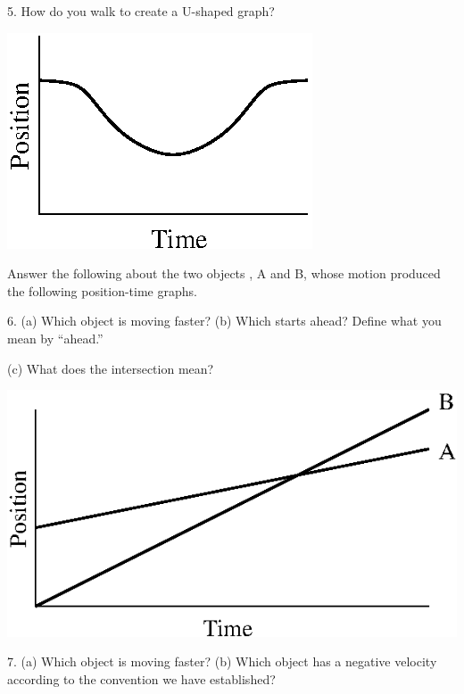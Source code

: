 5. How do you walk to create a U-shaped graph?

\vspace{0.3cm}
{\par\raggedright \includegraphics{position/position_fig9.eps} \par}
\vspace{0.3cm}

\pagebreak[2]
Answer the following about the two objects , A and B, whose motion produced
the following position-time graphs.

6. (a) Which object is moving faster? (b) Which starts ahead? Define what you
mean by ``ahead.''

(c) What does the intersection mean?

\vspace{0.3cm}
{\par\raggedright \includegraphics{position/position_fig10.eps} \par}
\vspace{0.3cm}

7. (a) Which object is moving faster? (b) Which object has a negative velocity
according to the convention we have established?

